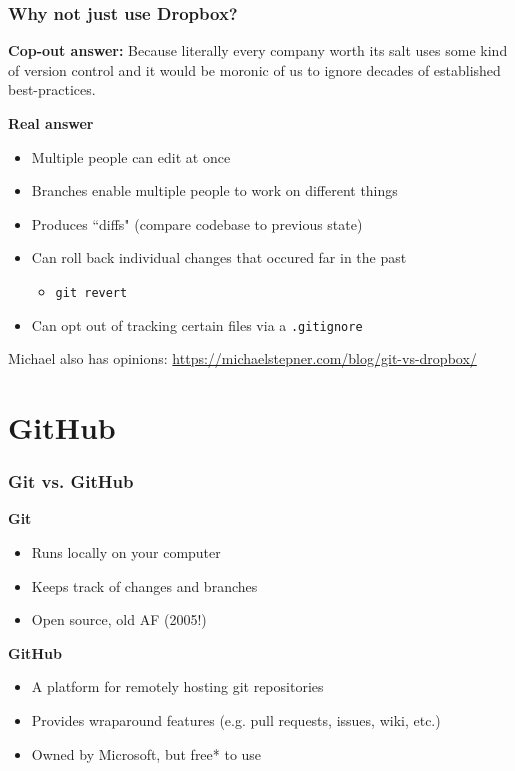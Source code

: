 \documentclass{ali-presentation}
\begin{document}
\begin{frame}
    \frametitle{Why not just use Dropbox?}
    
    \pause

    \textbf{Cop-out answer:}
    Because literally every company worth its salt uses some kind of version control and it would be moronic of us to ignore decades of established best-practices.

    \pause

    \textbf{Real answer}
    \begin{itemize}[<+->]
        \item Multiple people can edit at once
        \item Branches enable multiple people to work on different things
        \item Produces ``diffs" (compare codebase to previous state)
        \item Can roll back individual changes that occured far in the past
        \begin{itemize}
            \item \texttt{git revert}
        \end{itemize}
        \item Can opt out of tracking certain files via a \texttt{.gitignore}
    \end{itemize}

    \pause

    \tiny{Michael also has opinions: \url{https://michaelstepner.com/blog/git-vs-dropbox/}}

\end{frame}

\section{GitHub}

\begin{frame}
    \frametitle{Git vs. GitHub}

    \textbf{Git}

    \begin{itemize}
        \item Runs locally on your computer
        \item Keeps track of changes and branches
        \item Open source, old AF (2005!)
    \end{itemize}

    \pause

    \textbf{GitHub}

    \begin{itemize}
        \item A platform for remotely hosting git repositories 
        \item Provides wraparound features (e.g. pull requests, issues, wiki, etc.)
        \item Owned by Microsoft, but free* to use
    \end{itemize}
\end{frame}
\end{document}
